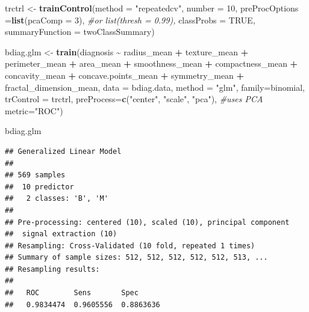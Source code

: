 \documentclass[
]{book}
\newenvironment{Shaded}{\begin{snugshade}}{\end{snugshade}}
\newcommand{\AttributeTok}[1]{\textcolor[rgb]{0.13,0.29,0.53}{#1}}
\newcommand{\CommentTok}[1]{\textcolor[rgb]{0.56,0.35,0.01}{\textit{#1}}}
\newcommand{\ConstantTok}[1]{\textcolor[rgb]{0.56,0.35,0.01}{#1}}
\newcommand{\DecValTok}[1]{\textcolor[rgb]{0.00,0.00,0.81}{#1}}
\newcommand{\FunctionTok}[1]{\textcolor[rgb]{0.13,0.29,0.53}{\textbf{#1}}}
\newcommand{\NormalTok}[1]{#1}
\newcommand{\OtherTok}[1]{\textcolor[rgb]{0.56,0.35,0.01}{#1}}
\newcommand{\SpecialCharTok}[1]{\textcolor[rgb]{0.81,0.36,0.00}{\textbf{#1}}}
\newcommand{\StringTok}[1]{\textcolor[rgb]{0.31,0.60,0.02}{#1}}
\begin{document}
\begin{Shaded}
\begin{Highlighting}[]
\NormalTok{trctrl }\OtherTok{\textless{}{-}} \FunctionTok{trainControl}\NormalTok{(}\AttributeTok{method =} \StringTok{"repeatedcv"}\NormalTok{, }
                       \AttributeTok{number =} \DecValTok{10}\NormalTok{,}
                       \AttributeTok{preProcOptions =}\FunctionTok{list}\NormalTok{(}\AttributeTok{pcaComp =} \DecValTok{3}\NormalTok{),  }\CommentTok{\#or list(thresh = 0.99),}
                       \AttributeTok{classProbs =} \ConstantTok{TRUE}\NormalTok{,  }
                       \AttributeTok{summaryFunction =}\NormalTok{ twoClassSummary)}

\NormalTok{bdiag.glm }\OtherTok{\textless{}{-}} \FunctionTok{train}\NormalTok{(diagnosis }\SpecialCharTok{\textasciitilde{}}\NormalTok{ radius\_mean }\SpecialCharTok{+}\NormalTok{ texture\_mean }\SpecialCharTok{+} 
\NormalTok{                     perimeter\_mean }\SpecialCharTok{+}\NormalTok{ area\_mean }\SpecialCharTok{+} 
\NormalTok{                     smoothness\_mean }\SpecialCharTok{+}\NormalTok{ compactness\_mean }\SpecialCharTok{+} 
\NormalTok{                     concavity\_mean }\SpecialCharTok{+}\NormalTok{ concave.points\_mean }\SpecialCharTok{+} 
\NormalTok{                     symmetry\_mean }\SpecialCharTok{+}\NormalTok{ fractal\_dimension\_mean,}
                   \AttributeTok{data =}\NormalTok{ bdiag.data,}
                   \AttributeTok{method =} \StringTok{"glm"}\NormalTok{,}
                   \AttributeTok{family=}\NormalTok{binomial,}
                   \AttributeTok{trControl =}\NormalTok{ trctrl,}
                   \AttributeTok{preProcess=}\FunctionTok{c}\NormalTok{(}\StringTok{"center"}\NormalTok{, }\StringTok{"scale"}\NormalTok{, }\StringTok{"pca"}\NormalTok{), }\CommentTok{\#uses PCA}
                   \AttributeTok{metric=}\StringTok{"ROC"}\NormalTok{)}

\NormalTok{bdiag.glm}
\end{Highlighting}
\end{Shaded}

\begin{verbatim}
## Generalized Linear Model 
## 
## 569 samples
##  10 predictor
##   2 classes: 'B', 'M' 
## 
## Pre-processing: centered (10), scaled (10), principal component
##  signal extraction (10) 
## Resampling: Cross-Validated (10 fold, repeated 1 times) 
## Summary of sample sizes: 512, 512, 512, 512, 512, 513, ... 
## Resampling results:
## 
##   ROC        Sens       Spec     
##   0.9834474  0.9605556  0.8863636
\end{verbatim}
\end{document}
